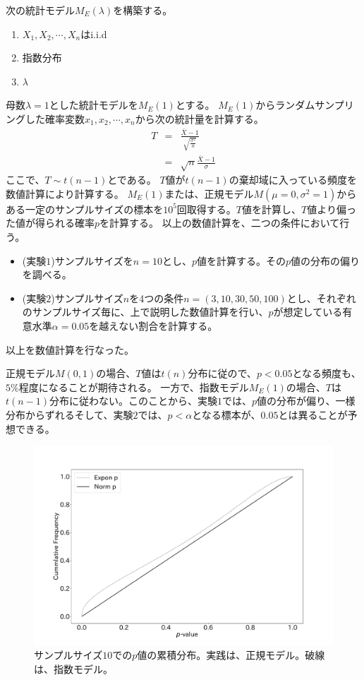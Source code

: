 次の統計モデル$M_E(\lambda)$を構築する。
\begin{enumerate}
    \item $X_1,X_2,\cdots,X_n $はi.i.d
    \item 指数分布
    \item $\lambda$
\end{enumerate}
母数$\lambda=1$とした統計モデルを$M_E(1)$とする。
$M_E(1)$からランダムサンプリングした確率変数$x_1,x_2,\cdots,x_n$から次の統計量を計算する。
\begin{eqnarray*}
    T &=& \frac{\bar{X}-1}{\sqrt{\frac{\sigma^2}{n}}} \\
 &=& \sqrt{n}\frac{\bar{X}-1}{\sigma}%
\end{eqnarray*}
ここで、$T \sim t(n-1)$とである。
$T$値が$t(n-1)$の棄却域に入っている頻度を数値計算により計算する。
$M_E(1)$または、正規モデル$M(\mu=0,\sigma^2=1)$からある一定のサンプルサイズの標本を$10^5$回取得する。$T$値を計算し、$T$値より偏った値が得られる確率$p$を計算する。
以上の数値計算を、二つの条件において行う。
\begin{itemize}
 \item (実験$1$)サンプルサイズを$n=10$とし、$p$値を計算する。その$p$値の分布の偏りを調べる。
 \item (実験$2$)サンプルサイズ$n$を4つの条件$n=(3,10,30,50,100)$とし、それぞれのサンプルサイズ毎に、上で説明した数値計算を行い、$p$が想定している有意水準$\alpha=0.05$を越えない割合を計算する。%
\end{itemize}
以上を数値計算を行なった。

正規モデル$M(0,1)$の場合、$T$値は$t(n)$分布に従ので、$p<0.05$となる頻度も、$5\%$程度になることが期待される。
一方で、指数モデル$M_E(1)$の場合、$T$は$t(n-1)$分布に従わない。このことから、実験$1$では、$p$値の分布が偏り、一様分布からずれるそして、実験$2$では、$p<\alpha$となる標本が、$0.05$とは異ることが予想できる。


\begin{figure}
 \begin{center}
  \includegraphics[width=15cm]{./image/04_/N_10_Exponn_T_test.pdf}
  \caption{サンプルサイズ$10$での$p$値の累積分布。実践は、正規モデル。破線は、指数モデル。}
  \label{fig:model_dependent_T_test}
 \end{center}
\end{figure}


